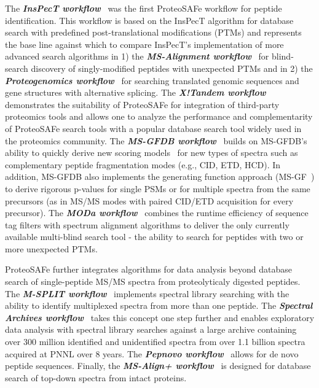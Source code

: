 \documentclass[arial,11pt]{article}
\newcommand{\SF}[1]{\textsf{#1}}
\newcommand{\SYSTEM}[0]{\SF{ProteoSAFe}\xspace}
\begin{document}
The \textbf{\em InsPecT workflow}~\cite{Tanner:2005}  was the first \SYSTEM workflow for peptide identification. This workflow is based on the InsPecT algorithm for database search with predefined post-translational modifications (PTMs) and represents the base line against which to compare InsPecT's implementation of more advanced search algorithms in
 1) the \textbf{\em MS-Alignment workflow}~\cite{Tsur:2005}  for blind-search discovery of singly-modified peptides with unexpected PTMs and in 2) the \textbf{\em Proteogenomics workflow}~\cite{Castellana:2010} for searching translated genomic sequences and gene structures with alternative splicing. The \textbf{\em X!Tandem workflow}~\cite{Craig:2004} demonstrates the suitability of \SYSTEM for integration of third-party proteomics tools and allows one to analyze  the performance and complementarity of \SYSTEM search tools with a popular database search tool widely used in the proteomics community. The \textbf{\em MS-GFDB workflow}~\cite{Kim:2010} builds on MS-GFDB's ability to quickly derive new  scoring models~\cite{Kim:2009} for new types of spectra such as complementary peptide fragmentation modes (e.g., CID, ETD, HCD).
In addition, MS-GFDB also implements the generating function approach (MS-GF~\cite{Kim:2008}) to derive rigorous p-values for single PSMs or for multiple spectra from the same precursors (as in MS/MS modes with paired CID/ETD acquisition for every precursor). The \textbf{\em MODa workflow}~\cite{Na:2010}  combines the runtime efficiency of sequence tag filters with spectrum alignment algorithms to deliver the only currently available multi-blind search tool - the ability to search for peptides with two or more unexpected PTMs.

\SYSTEM further integrates algorithms for data analysis beyond database search of single-peptide MS/MS spectra from proteolyticaly digested peptides. The \textbf{\em M-SPLIT workflow}~\cite{Wang:2010}  implements spectral library searching with the ability to identify multiplexed spectra from more than one peptide. The \textbf{\em Spectral Archives workflow}~\cite{Frank:2008} takes this concept one step further and enables exploratory data analysis with spectral library searches against a large archive containing over 300 million identified and unidentified spectra from over 1.1 billion spectra acquired at PNNL over 8 years. The \textbf{\em Pepnovo workflow}~\cite{Frank:2005} allows for
de novo peptide sequences.
Finally, the \textbf{\em MS-Align+ workflow}~\cite{Liu:2010}  is designed for database search of top-down spectra from intact proteins.
\end{document}
